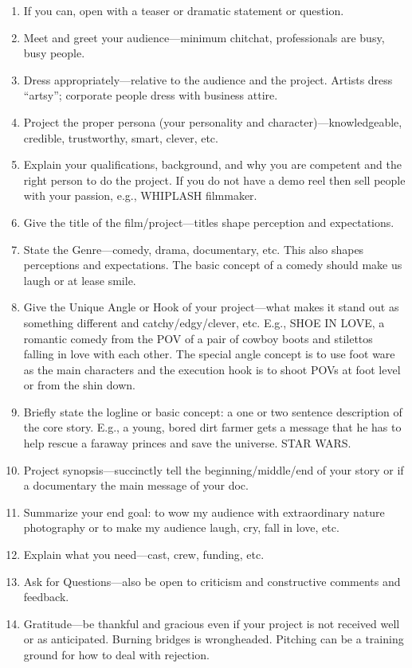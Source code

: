 \documentclass[
]{book}
\begin{document}
\begin{reflect}
\begin{enumerate}
\def\labelenumi{\arabic{enumi}.}
\item
  If you can, open with a teaser or dramatic statement or question.
\item
  Meet and greet your audience---minimum chitchat, professionals are busy, busy people.
\item
  Dress appropriately---relative to the audience and the project. Artists dress
  ``artsy''; corporate people dress with business attire.
\item
  Project the proper persona (your personality and character)---knowledgeable, credible, trustworthy, smart, clever, etc.
\item
  Explain your qualifications, background, and why you are competent and the right person to do the project. If you do not have a demo reel then sell people with your passion, e.g., WHIPLASH filmmaker.
\item
  Give the title of the film/project---titles shape perception and expectations.
\item
  State the Genre---comedy, drama, documentary, etc. This also shapes perceptions and expectations. The basic concept of a comedy should make us laugh or at lease smile.
\item
  Give the Unique Angle or Hook of your project---what makes it stand out as something different and catchy/edgy/clever, etc. E.g., SHOE IN LOVE, a romantic comedy from the POV of a pair of cowboy boots and stilettos falling in love with each other. The special angle concept is to use foot ware as the main characters and the execution hook is to shoot POVs at foot level or from the shin down.
\item
  Briefly state the logline or basic concept: a one or two sentence description of the core story. E.g., a young, bored dirt farmer gets a message that he has to help rescue a faraway princes and save the universe. STAR WARS.
\item
  Project synopsis---succinctly tell the beginning/middle/end of your story or if a documentary the main message of your doc.
\item
  Summarize your end goal: to wow my audience with extraordinary nature photography or to make my audience laugh, cry, fall in love, etc.
\item
  Explain what you need---cast, crew, funding, etc.
\item
  Ask for Questions---also be open to criticism and constructive comments and feedback.
\item
  Gratitude---be thankful and gracious even if your project is not received well or as anticipated. Burning bridges is wrongheaded. Pitching can be a training ground for how to deal with rejection.
\end{enumerate}


\end{reflect}
\end{document}
